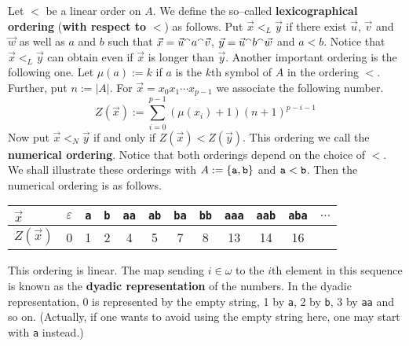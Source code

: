 Let $<$ be a linear order on $A$. We define the so--called
\textbf{lexicographical ordering} (\textbf{with respect to} $<$)
as follows.
Put $\vec{x} <_L \vec{y}$ if there exist $\vec{u}$, $\vec{v}$ and
$\vec{w}$ as well as $a$ and $b$ such that $\vec{x} = \vec{u}
{^{\smallfrown}} a {^{\smallfrown}} \vec{v}$, $\vec{y} = \vec{u} {^{\smallfrown}} b {^{\smallfrown}} \vec{w}$
and $a < b$. Notice that $\vec{x} <_L \vec{y}$ can obtain even if
$\vec{x}$ is longer than $\vec{y}$. Another important ordering
is the following one. Let $\mu(a) := k$ if $a$ is the $k$th symbol
of $A$ in the ordering $<$. Further, put $n := |A|$. For $\vec{x}
= x_0 x_1 \dotsb x_{p-1}$ we associate the following number.
\begin{equation}
Z(\vec{x}) := \sum_{i = 0}^{p-1} (\mu(x_i)+1) (n+1)^{p-i-1}
\end{equation}
Now put $\vec{x} <_N \vec{y}$ if and only if $Z(\vec{x}) <
Z(\vec{y})$. This ordering we call the \textbf{numerical ordering}.
Notice that both orderings depend on the choice of $<$. We shall 
illustrate these orderings with $A := \{\mbox{\tt a},\mbox{\tt b}\}$ 
and $\mbox{\tt a} < \mbox{\tt b}$. 
Then the numerical ordering is as follows.
\begin{center}
\begin{tabular}{l|ccccccccccc}
$\vec{x}$ &
$\varepsilon$ & \mbox{\tt a} & \mbox{\tt b} & \mbox{\tt aa} &
\mbox{\tt ab} & \mbox{\tt ba} & \mbox{\tt bb} & \mbox{\tt aaa} &
\mbox{\tt aab} & \mbox{\tt aba} & $\dotsc$ \\\hline
$Z(\vec{x})$ &
0 & 1 & 2 & 4 & 5 & 7 & 8 & 13 & 14 & 16 & \\
\end{tabular}
\end{center}
This ordering is linear. The map sending $i \in \omega$ to the
$i$th element in this sequence is known as the \textbf{dyadic
representation} of the numbers.
In the dyadic representation, $0$ is represented by the
empty string, 1 by {\tt a}, 2 by {\tt b}, 3 by {\tt aa}
and so on. (Actually, if one wants to avoid using the empty
string here, one may start with {\tt a} instead.)

